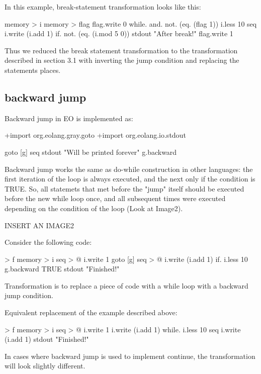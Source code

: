 \documentclass[sigplan,review,11pt,nonacm,natbib=false]{acmart}
\begin{document}
In this example, break-statement transformation looks like this:
\begin{ffcode}
[]
 memory > i
 memory > flag
 flag.write 0
 while.
  and.
   not. (eq. (flag 1))
   i.less 10
  seq
   i.write (i.add 1)
   if.
    not. (eq. (i.mod 5 0))
    stdout "After break!"
    flag.write 1
\end{ffcode}

Thus we reduced the break statement transformation to the transformation described in section 3.1 with inverting the jump condition and replacing the statements places.


\subsection{backward jump}
Backward jump in EO is implemented as:

\begin{ffcode}
+import org.eolang.gray.goto
+import org.eolang.io.stdout

goto
 [g]
  seq
   stdout "Will be printed forever"
   g.backward
\end{ffcode}

Backward jump works the same as do-while construction in other languages: the first iteration of the loop is always executed, and the next only if the condition is TRUE.
So, all statemets that met before the "jump" itself should be executed before the new while loop once, and all subsequent times were executed depending on the condition of the loop (Look at Image2).

{INSERT AN IMAGE2}

Consider the following code:
\begin{ffcode}
[] > f
 memory > i
 seq > @
  i.write 1
  goto
   [g]
    seq > @
     i.write (i.add 1)
     if.
      i.less 10
      g.backward
      TRUE
 stdout "Finished!"
\end{ffcode}

Transformation is to replace a piece of code with a while loop with a backward jump condition.

Equivalent replacement of the example described above:
\begin{ffcode}
[] > f
 memory > i
 seq > @
  i.write 1
  i.write (i.add 1)
  while.
   i.less 10
   seq
    i.write (i.add 1)
 stdout "Finished!"
\end{ffcode}

In cases where backward jump is used to implement continue, the transformation will look slightly different.
\end{document}
